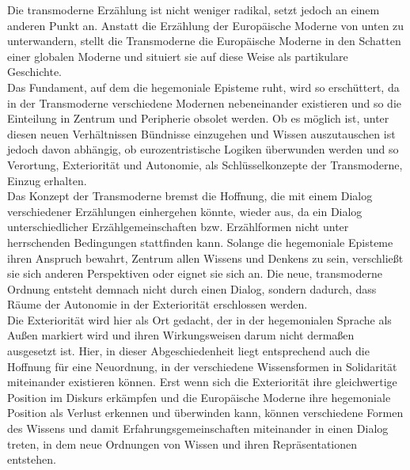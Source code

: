 \noindent Die transmoderne Erzählung ist nicht weniger radikal, setzt jedoch an einem
anderen Punkt an. Anstatt die Erzählung der Europäische Moderne von unten zu
unterwandern, stellt die Transmoderne die Europäische Moderne in den Schatten
einer globalen Moderne und situiert sie auf diese Weise als partikulare
Geschichte. \\
Das Fundament, auf dem die hegemoniale Episteme ruht, wird so
erschüttert, da in der Transmoderne verschiedene Modernen nebeneinander
existieren und so die Einteilung in Zentrum und Peripherie obsolet werden. Ob es
möglich ist, unter diesen neuen Verhältnissen Bündnisse einzugehen und Wissen
auszutauschen ist jedoch davon abhängig, ob eurozentristische Logiken überwunden
werden und so Verortung, Exteriorität und Autonomie, als Schlüsselkonzepte der
Transmoderne, Einzug erhalten. \\
Das Konzept der Transmoderne bremst die Hoffnung,
die mit einem Dialog verschiedener Erzählungen einhergehen könnte, wieder aus,
da ein Dialog unterschiedlicher Erzählgemeinschaften bzw. Erzählformen nicht
unter herrschenden Bedingungen stattfinden kann. Solange die hegemoniale
Episteme ihren Anspruch bewahrt, Zentrum allen Wissens und Denkens zu sein,
verschließt sie sich anderen Perspektiven oder eignet sie sich an. Die neue,
transmoderne Ordnung entsteht demnach nicht durch einen Dialog, sondern dadurch,
dass Räume der Autonomie in der Exteriorität erschlossen werden. \\
Die
Exteriorität wird hier als Ort gedacht, der in der hegemonialen Sprache als
Außen markiert wird und ihren Wirkungsweisen darum nicht dermaßen ausgesetzt
ist. Hier, in dieser Abgeschiedenheit liegt entsprechend auch die Hoffnung für
eine Neuordnung, in der verschiedene Wissensformen in Solidarität miteinander
existieren können. Erst wenn sich die Exteriorität ihre gleichwertige Position
im Diskurs erkämpfen und die Europäische Moderne ihre hegemoniale Position  als
Verlust erkennen und überwinden kann, können verschiedene Formen des Wissens und
damit Erfahrungsgemeinschaften miteinander in einen Dialog treten, in dem neue
Ordnungen von Wissen und ihren Repräsentationen entstehen.\\

